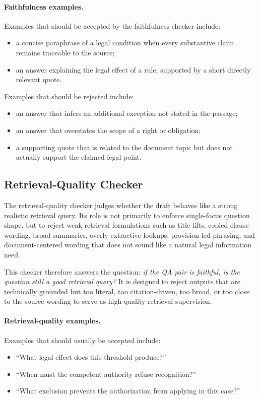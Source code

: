 \paragraph{Faithfulness examples.}
Examples that should be accepted by the faithfulness checker include:
\begin{itemize}
\item a concise paraphrase of a legal condition when every substantive claim remains traceable to the source;
\item an answer explaining the legal effect of a rule, supported by a short directly relevant quote.
\end{itemize}

Examples that should be rejected include:
\begin{itemize}
\item an answer that infers an additional exception not stated in the passage;
\item an answer that overstates the scope of a right or obligation;
\item a supporting quote that is related to the document topic but does not actually support the claimed legal point.
\end{itemize}

\subsection{Retrieval-Quality Checker}

The retrieval-quality checker judges whether the draft behaves like a strong realistic retrieval query. Its role is not primarily to enforce single-focus question shape, but to reject weak retrieval formulations such as title lifts, copied clause wording, broad summaries, overly extractive lookups, provision-led phrasing, and document-centered wording that does not sound like a natural legal information need.

This checker therefore answers the question: \emph{if the QA pair is faithful, is the question still a good retrieval query?} It is designed to reject outputs that are technically grounded but too literal, too citation-driven, too broad, or too close to the source wording to serve as high-quality retrieval supervision.

\paragraph{Retrieval-quality examples.}
Examples that should usually be accepted include:
\begin{itemize}
\item ``What legal effect does this threshold produce?''
\item ``When must the competent authority refuse recognition?''
\item ``What exclusion prevents the authorization from applying in this case?''
\end{itemize}

